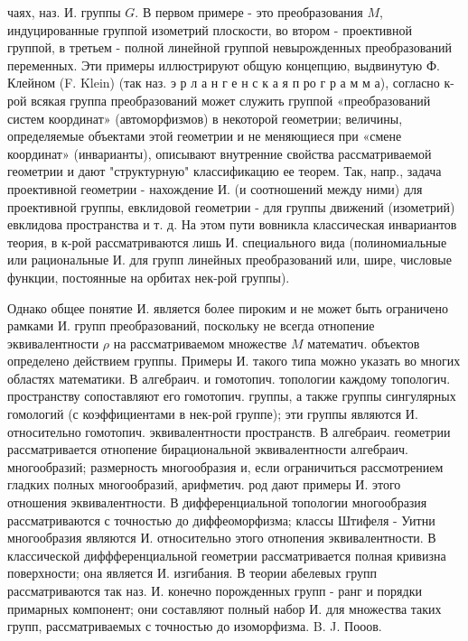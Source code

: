 \documentclass[10pt]{article}
\begin{document}
чаях, наз. И. группы $G$. В первом примере - это преобразования $M$, индуцированные группой изометрий плоскости, во втором - проективной группой, в третьем - полной линейной группой невырожденных преобразований переменных. Эти примеры иллюстрируют общую концепцию, выдвинутую Ф. Клейном (F. Klein) (так наз. э р л а н г е н с к а я п ро г р а м м а), согласно к-рой всякая группа преобразований может служить группой «преобразований систем координат» (автоморфизмов) в некоторой геометрии; величины, определяемые объектами этой геометрии и не меняющиеся при «смене координат» (инварианты), описывают внутренние свойства рассматриваемой геометрии и дают "структурную" классификацию ее теорем. Так, напр., задача проективной геометрии - нахождение И. (и соотношений между ними) для проективной группы, евклидовой геометрии - для группы движений (изометрий) евклидова пространства и т. д. На этом пути вовникла классическая инвариантов теория, в к-рой рассматриваются лишь И. специального вида (полиномиальные или рациональные И. для групп линейных преобразований или, шире, числовые функции, постоянные на орбитах нек-рой группы).



Однако общее понятие И. является более пироким и не может быть ограничено рамками И. групп преобразований, поскольку не всегда отнопение эквивалентности $\rho$ на рассматриваемом множестве $M$ математич. объектов определено действием группы. Примеры И. такого типа можно указать во многих областях математики. В алгебраич. и гомотопич. топологии каждому топологич. пространству сопоставляют его гомотопич. группы, а также группы сингулярных гомологий (с коэффициентами в нек-рой группе); эти группы являются И. относительно гомотопич. эквивалентности пространств. В алгебраич. геометрии рассматривается отнопение бирациональной эквивалентности алгебраич. многообразий; размерность многообразия и, если ограничиться рассмотрением гладких полных многообразий, арифметич. род дают примеры И. этого отношения эквивалентности. В дифференциальной топологии многообразия рассматриваются с точностью до диффеоморфизма; классы Штифеля - Уитни многообразия являются И. относительно этого отнопения эквивалентности. В классической диффференциальной геометрии рассматривается полная кривизна поверхности; она является И. изгибания. В теории абелевых групп рассматриваются так наз. И. конечно порожденных групп - ранг и порядки примарных компонент; они составляют полный набор И. для множества таких групп, рассматриваемых с точностью до изоморфизма. B. J. Пооов.
\end{document}
